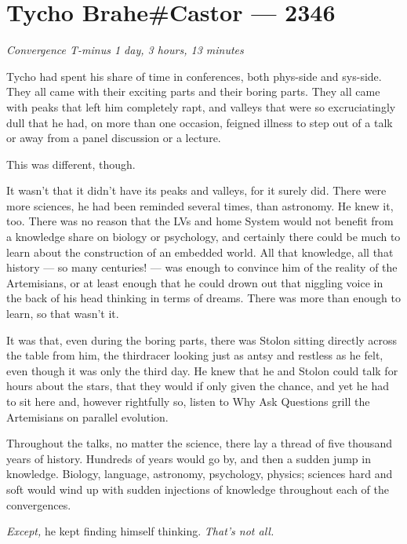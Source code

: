 \hypertarget{tycho-brahecastor-2346}{%
\chapter{Tycho Brahe\#Castor — 2346}\label{tycho-brahecastor-2346}}

\begin{center}
\emph{Convergence T-minus 1 day, 3 hours, 13 minutes}
\end{center}

\noindent Tycho had spent his share of time in conferences, both phys-side and sys-side. They all came with their exciting parts and their boring parts. They all came with peaks that left him completely rapt, and valleys that were so excruciatingly dull that he had, on more than one occasion, feigned illness to step out of a talk or away from a panel discussion or a lecture.

This was different, though.

It wasn't that it didn't have its peaks and valleys, for it surely did. There were more sciences, he had been reminded several times, than astronomy. He knew it, too. There was no reason that the LVs and home System would not benefit from a knowledge share on biology or psychology, and certainly there could be much to learn about the construction of an embedded world. All that knowledge, all that history --- so many centuries! --- was enough to convince him of the reality of the Artemisians, or at least enough that he could drown out that niggling voice in the back of his head thinking in terms of dreams. There was more than enough to learn, so that wasn't it.

It was that, even during the boring parts, there was Stolon sitting directly across the table from him, the thirdracer looking just as antsy and restless as he felt, even though it was only the third day. He knew that he and Stolon could talk for hours about the stars, that they would if only given the chance, and yet he had to sit here and, however rightfully so, listen to Why Ask Questions grill the Artemisians on parallel evolution.

Throughout the talks, no matter the science, there lay a thread of five thousand years of history. Hundreds of years would go by, and then a sudden jump in knowledge. Biology, language, astronomy, psychology, physics; sciences hard and soft would wind up with sudden injections of knowledge throughout each of the convergences.

\emph{Except,} he kept finding himself thinking. \emph{That's not all.}


